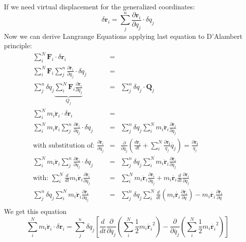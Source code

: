 If we need virtual displacement for the generalized coordinates:
\begin{equation}
	\delta\mathbf{r}_i = \sum_j^n{\frac{\partial\mathbf{r}_i}{\partial q_j}\cdot \delta q_j}
\end{equation}
Now we can derive Langrange Equations applying last equation to D'Alambert principle:
\begin{eqnarray*}
\sum_i^N{\mathbf{F}_i \cdot \delta \mathbf{r}_i} &=& \\ \sum_i^N{\mathbf{F}_i\sum_j^n{\frac{\partial\mathbf{r}_i}{\partial q_j}\cdot \delta q_j}}&=&\\
\sum_j^n{\delta q_j\underbrace{\sum_i^N{\mathbf{F}_i}\frac{\partial\mathbf{r}_i}{\partial q_j}}_\text{$Q_j$}}&=&\boxed{\sum_j^n{\delta q_j\cdot \mathbf{Q}_j}}\\
\sum_i^N{m_i\ddot{\mathbf{r}}_i \cdot \delta \mathbf{r}_i}&=&\\
\sum_i^N{m_i\ddot{\mathbf{r}}_i \sum_j^n{\frac{\partial\mathbf{r}_i}{\partial q_j}\cdot \delta q_j}}&=&
\sum_j^n{\delta q_j\sum_i^N{m_i\ddot{\mathbf{r}}_i\frac{\partial\mathbf{r}_i}{\partial q_j}}}\\
\text{with substitution of: } \frac{\partial\dot{\mathbf{r}_i}}{\partial \dot{q_j}} &=& \frac{\partial}{\partial \dot{q_j}}\left(\frac{d\mathbf{r}_i}{dt} + \sum^N_i{\frac{\partial \mathbf{r_i}}{q_j}\dot{q_j}}\right) = \frac{\partial \mathbf{r_i}}{q_j}\\
\sum_i^N{m_i\ddot{\mathbf{r}}_i \sum_j^n{\frac{\partial\mathbf{r}_i}{\partial q_j}\cdot \delta q_j}}&=&
\sum_j^n{\delta q_j\sum_i^N{m_i\ddot{\mathbf{r}}_i\frac{\partial\dot{\mathbf{r}_i}}{\partial \dot{q_j}}}}\\
\text{with: }\sum_i^N{\frac{d}{dt}m_i\dot{\mathbf{r}}_i\frac{\partial\dot{\mathbf{r}_i}}{\partial \dot{q_j}}} &=& \sum_i^N{m_i\ddot{\mathbf{r}}_i\frac{\partial\dot{\mathbf{r}_i}}{\partial \dot{q_j}}+m_i\dot{\mathbf{r}_i}\frac{d}{dt}\frac{\partial \mathbf{r}_i}{\partial q_j}}\\
\sum_j^n{\delta q_j\sum_i^N{m_i\ddot{\mathbf{r}}_i\frac{\partial\mathbf{r}_i}{\partial \dot{q_j}}}} &=& \sum_j^n{\delta q_j\sum_i^N{\frac{d}{dt}\left(m_i\dot{\mathbf{r}_i}\frac{\partial\dot{\mathbf{r}_i}}{\partial \dot{q}}\right)-m_i\dot{\mathbf{r}_i}\frac{\partial\dot{\mathbf{r}_i}}{\partial q}}}\\
\end{eqnarray*}
We get this equation
\begin{equation}
\boxed{\sum_i^N{m_i\ddot{\mathbf{r}}_i \cdot \delta \mathbf{r}_i} =\sum_j^n{\delta q_j\left[\frac{d}{dt}\frac{\partial}{\partial \dot{q_j}}\left(\sum_i^N\frac{1}{2}m_i\dot{\mathbf{r}_i}^2\right)-\frac{\partial}{\partial \dot{q_j}}\left(\sum_i^N\frac{1}{2}m_i\dot{\mathbf{r}_i}^2\right)\right]}}
\end{equation}
